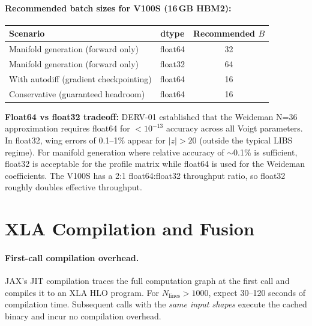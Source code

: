 \documentclass[11pt]{article}
\begin{document}
\paragraph{Recommended batch sizes for V100S (16\,GB HBM2):}
\begin{center}
\begin{tabular}{lcc}
\toprule
\textbf{Scenario} & \textbf{dtype} & \textbf{Recommended $B$} \\
\midrule
Manifold generation (forward only) & float64 & 32 \\
Manifold generation (forward only) & float32 & 64 \\
With autodiff (gradient checkpointing) & float64 & 16 \\
Conservative (guaranteed headroom) & float64 & 16 \\
\bottomrule
\end{tabular}
\end{center}

\textbf{Float64 vs float32 tradeoff:} DERV-01 established that the
Weideman N=36 approximation requires float64 for $<10^{-13}$ accuracy
across all Voigt parameters. In float32, wing errors of 0.1--1\% appear
for $|z| > 20$ (outside the typical LIBS regime). For manifold generation
where relative accuracy of $\sim$0.1\% is sufficient, float32 is acceptable
for the profile matrix while float64 is used for the Weideman coefficients.
The V100S has a 2:1 float64:float32 throughput ratio, so float32 roughly
doubles effective throughput.



\section{XLA Compilation and Fusion}
\label{sec:xla}

\paragraph{First-call compilation overhead.}
JAX's JIT compilation traces the full computation graph at the first call
and compiles it to an XLA HLO program. For $N_\mathrm{lines} > 1000$,
expect 30--120 seconds of compilation time. Subsequent calls with the
\emph{same input shapes} execute the cached binary and incur no compilation
overhead.
\end{document}
